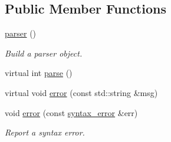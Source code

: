 \subsection*{Public Member Functions}
\begin{DoxyCompactItemize}
\item 
\hypertarget{classyy_1_1parser_a933976dee016ee0623704a75a53551a4}{}\hyperlink{classyy_1_1parser_a933976dee016ee0623704a75a53551a4}{parser} ()\label{classyy_1_1parser_a933976dee016ee0623704a75a53551a4}

\begin{DoxyCompactList}\small\item\em Build a parser object. \end{DoxyCompactList}\item 
virtual int \hyperlink{classyy_1_1parser_ac54cad6da907397a978922bfe246e6f8}{parse} ()
\item 
virtual void \hyperlink{classyy_1_1parser_a3a740797fdf8f0ea046b20ffbc6c3f08}{error} (const std\+::string \&msg)
\item 
\hypertarget{classyy_1_1parser_a55d4a04712e5fa9f33baed8f92b3eb05}{}void \hyperlink{classyy_1_1parser_a55d4a04712e5fa9f33baed8f92b3eb05}{error} (const \hyperlink{structyy_1_1parser_1_1syntax__error}{syntax\+\_\+error} \&err)\label{classyy_1_1parser_a55d4a04712e5fa9f33baed8f92b3eb05}

\begin{DoxyCompactList}\small\item\em Report a syntax error. \end{DoxyCompactList}\end{DoxyCompactItemize}
